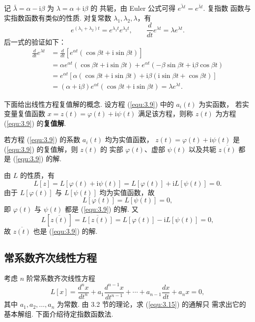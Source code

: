 记 $\bar\lambda=\alpha-\mathrm{i}\beta$ 为 $\lambda=\alpha+\mathrm{i}\beta$ 的
共轭，由 Euler 公式可得 $\overline{e^{\lambda t}}=e^{\bar\lambda t}$. 复指数
函数与实指数函数有类似的性质. 对复常数 $\lambda_1,\lambda_2,\lambda$，有
\[
e^{(\lambda_1+\lambda_2)t}=e^{\lambda_1t}e^{\lambda_2t},\qquad
\frac{d}{dt}e^{\lambda t}=\lambda e^{\lambda t}.
\]
后一式的验证如下：
\[
\begin{aligned}
\frac{d}{dt}e^{\lambda t}
&=\frac{d}{dt}\left[e^{\alpha t}(\cos\beta t
+\mathrm{i}\sin\beta t)\right]\\
&=\alpha e^{\alpha t}(\cos\beta t+\mathrm{i}\sin\beta t)
+e^{\alpha t}(-\beta\sin\beta t+\mathrm{i}\beta\cos\beta t)\\
&=e^{\alpha t}\left[\alpha(\cos\beta t+\mathrm{i}\sin\beta t)
+\mathrm{i}\beta(\mathrm{i}\sin\beta t+\cos\beta t)\right]\\
&=(\alpha+\mathrm{i}\beta)e^{\alpha t}(\cos\beta t
+\mathrm{i}\sin\beta t)=\lambda e^{\lambda t}.
\end{aligned}
\]

下面给出线性方程复值解的概念. 设方程 (\ref{equ:3.9}) 中的 $a_i(t)$ 为实函数，
若实变量复值函数 $x=z(t)=\varphi(t)+\mathrm{i}\psi(t)$ 满足该方程，则称 $z(t)$
为方程 (\ref{equ:3.9}) 的\textbf{复值解}.

\begin{thm}\label{thm:3.3.1}
若方程 (\ref{equ:3.9}) 的系数 $a_i(t)$ 均为实值函数，
$z(t)=\varphi(t)+\mathrm{i}\psi(t)$ 是 (\ref{equ:3.9}) 的复值解，则 $z(t)$ 的
实部 $\varphi(t)$、虚部 $\psi(t)$ 以及共轭 $\overline{z(t)}$ 都是 (\ref{equ:3.9})
的解.
\end{thm}
\begin{pf1}
由 $L$ 的性质，有
\[
L[z]=L\left[\varphi(t)+\mathrm{i}\psi(t)\right]
=L[\varphi(t)]+\mathrm{i}L[\psi(t)]=0.
\]
由于 $L[\varphi(t)]$ 与 $L[\psi(t)]$ 均为实值函数，故
\[
L[\varphi(t)]=L[\psi(t)]=0,
\]
即 $\varphi(t)$ 与 $\psi(t)$ 都是 (\ref{equ:3.9}) 的解. 又
\[
L\left[\overline{z(t)}\right]=\overline{L[z(t)]}
=L[\varphi(t)]-\mathrm{i}L[\psi(t)]=0,
\]
故 $\overline{z(t)}$ 也是 (\ref{equ:3.9}) 的解.
\end{pf1}

\subsection{常系数齐次线性方程}
考虑 $n$ 阶常系数齐次线性方程
\begin{equation}\label{equ:3.15}
L[x]=\frac{d^n x}{dt^n}+a_1\frac{d^{n-1}x}{dt^{n-1}}+\cdots
+a_{n-1}\frac{dx}{dt}+a_nx=0,
\end{equation}
其中 $a_1,a_2,\dots,a_n$ 为常数. 由 3.2 节的理论，求 (\ref{equ:3.15}) 的通解只
需求出它的基本解组. 下面介绍待定指数函数法.

